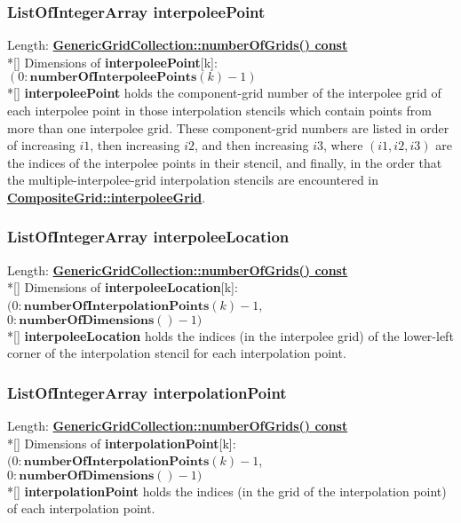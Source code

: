 \documentclass{article}
\begin{document}
  \subsubsection{ListOfIntegerArray interpoleePoint}
  \label{CompositeGrid::interpoleePoint}
    Length: {\bf{}\hyperref{numberOfGrids()}{numberOfGrids() \rm(\S}{)}{GenericGridCollection::numberOfGrids() const}} \\*[\parskip]
    Dimensions of \textbf{interpoleePoint}[k]: $(0\colon\textbf{numberOfInterpoleePoints}(k)-1)$ \\*[\parskip]
    \textbf{interpoleePoint} holds the component-grid number of the interpolee grid of each interpolee point in those interpolation stencils
    which contain points from more than one interpolee grid.  These component-grid numbers are listed in order of increasing $i1$, then increasing
    $i2$, and then increasing $i3$, where $(i1,i2,i3)$ are the indices of the interpolee points in their stencil, and finally, in the order that
    the multiple-interpolee-grid interpolation stencils are encountered in
    {\bf{}\hyperref{interpoleeGrid$[k]$}{interpoleeGrid$[k]$ \rm(\S}{)}{CompositeGrid::interpoleeGrid}}.

  \subsubsection{ListOfIntegerArray interpoleeLocation}
  \label{CompositeGrid::interpoleeLocation}
    Length: {\bf{}\hyperref{numberOfGrids()}{numberOfGrids() \rm(\S}{)}{GenericGridCollection::numberOfGrids() const}} \\*[\parskip]
    Dimensions of \textbf{interpoleeLocation}[k]:
    $(0\colon\textbf{numberOfInterpolationPoints}(k)-1$, $0\colon\textbf{numberOfDimensions}()-1)$ \\*[\parskip]
    \textbf{interpoleeLocation} holds the indices (in the interpolee grid) of the lower-left corner of the interpolation stencil for each interpolation point.

  \subsubsection{ListOfIntegerArray interpolationPoint}
  \label{CompositeGrid::interpolationPoint}
    Length: {\bf{}\hyperref{numberOfGrids()}{numberOfGrids() \rm(\S}{)}{GenericGridCollection::numberOfGrids() const}} \\*[\parskip]
    Dimensions of \textbf{interpolationPoint}[k]:
    $(0\colon\textbf{numberOfInterpolationPoints}(k)-1$, $0\colon\textbf{numberOfDimensions}()-1)$ \\*[\parskip]
    \textbf{interpolationPoint} holds the indices (in the grid of the interpolation point) of each interpolation point.
\end{document}
